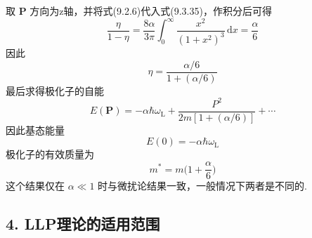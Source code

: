 取 $\boldsymbol{P}$ 方向为z轴，并将式(9.2.6)代入式(9.3.35)，作积分后可得
\begin{equation*}
  \frac{\eta}{1-\eta}=\frac{8\alpha}{3\pi}
  \int_{0}^{\infty}\frac{x^{2}}{(1+x^{2})^{3}}\,\mathrm{d}x=\frac{\alpha}{6}
\end{equation*}
因此
\begin{equation}
  \eta=\frac{\alpha/6}{1+(\alpha/6)}
\end{equation}
最后求得极化子的自能
\begin{equation}
  E(\boldsymbol{P})=-\alpha\hbar\omega_{\mathrm L}
  +\frac{P^{2}}{2m\left[1+(\alpha/6)\right]}+\cdots
\end{equation}
因此基态能量
\begin{equation*}
  E(0)=-\alpha\hbar\omega_{\mathrm L}
\end{equation*}
极化子的有效质量为
\begin{equation}
  m^{*}=m\biggl(1+\frac{\alpha}{6}\biggr)
\end{equation}
这个结果仅在 $\alpha\ll1$ 时与微扰论结果一致，一般情况下两者是不同的.

\subsection*{4. LLP理论的适用范围}

